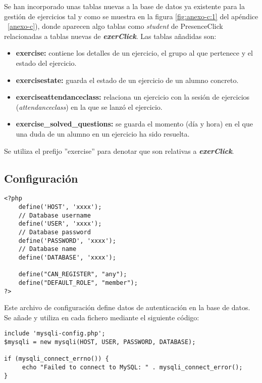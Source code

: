 Se han incorporado unas tablas nuevas a la base de datos ya existente para la gestión de ejercicios tal y como se muestra en la figura \ref{fig:anexo-c:1} del apéndice ~\ref{anexo-c}), donde aparecen algo tablas como \textit{student} de PresenceClick relacionadas a tablas nuevas de \textit{\textbf{exerClick}}. Las tablas añadidas son:

\begin{itemize}
\item \textbf{exercise:} contiene los detalles de un ejercicio, el grupo al que pertenece y el estado del ejercicio.
\item \textbf{exercisestate:} guarda el estado de un ejercicio de un alumno concreto.
\item \textbf{exerciseattendanceclass:} relaciona un ejercicio con la sesión de ejercicios (\textit{attendanceclass}) en la que se lanzó el ejercicio.
\item \textbf{exercise\_solved\_questions:} se guarda el momento (día y hora) en el que una duda de un alumno en un ejercicio ha sido resuelta.
\end{itemize}

Se utiliza el prefijo ''exercise'' para denotar que son relativas a \textit{\textbf{exerClick}}.\\

\subsection{Configuración}
\label{diseno-e-implementacion:configuracion}

\noindent
\begin{lstlisting}[caption=Autenticación del usuario.,label={lst:autenticacion}]
<?php
	define('HOST', 'xxxx');
	// Database username
	define('USER', 'xxxx');
	// Database password
	define('PASSWORD', 'xxxx');
	// Database name
	define('DATABASE', 'xxxx'); 
	 
	define("CAN_REGISTER", "any");
	define("DEFAULT_ROLE", "member");
?>
\end{lstlisting}

Este archivo de configuración define datos de autenticación en la base de datos. Se añade y utiliza en cada fichero mediante el siguiente código:

\noindent
\begin{lstlisting}[caption=Autenticación del usuario.,label={lst:autenticacion}]
include 'mysqli-config.php';
$mysqli = new mysqli(HOST, USER, PASSWORD, DATABASE);

if (mysqli_connect_errno()) {
     echo "Failed to connect to MySQL: " . mysqli_connect_error();
}
\end{lstlisting}

